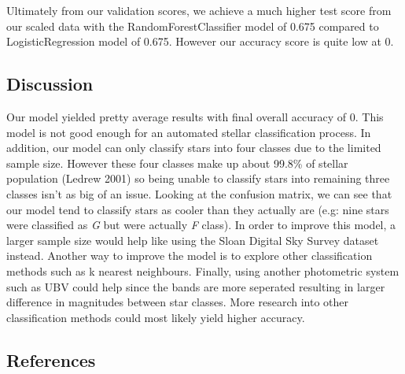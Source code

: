 \documentclass[
  letterpaper,
  DIV=11,
  numbers=noendperiod]{scrartcl}
\begin{document}
Ultimately from our validation scores, we achieve a much higher test
score from our scaled data with the RandomForestClassifier model of
0.675 compared to LogisticRegression model of 0.675. However our
accuracy score is quite low at 0.

\subsection{Discussion}\label{discussion}

Our model yielded pretty average results with final overall accuracy of
0. This model is not good enough for an automated stellar classification
process. In addition, our model can only classify stars into four
classes due to the limited sample size. However these four classes make
up about 99.8\% of stellar population (Ledrew 2001) so being unable to
classify stars into remaining three classes isn't as big of an issue.
Looking at the confusion matrix, we can see that our model tend to
classify stars as cooler than they actually are (e.g: nine stars were
classified as \emph{G} but were actually \emph{F} class). In order to
improve this model, a larger sample size would help like using the Sloan
Digital Sky Survey dataset instead. Another way to improve the model is
to explore other classification methods such as k nearest neighbours.
Finally, using another photometric system such as UBV could help since
the bands are more seperated resulting in larger difference in
magnitudes between star classes. More research into other classification
methods could most likely yield higher accuracy.

\subsection*{References}\label{references}
\end{document}
